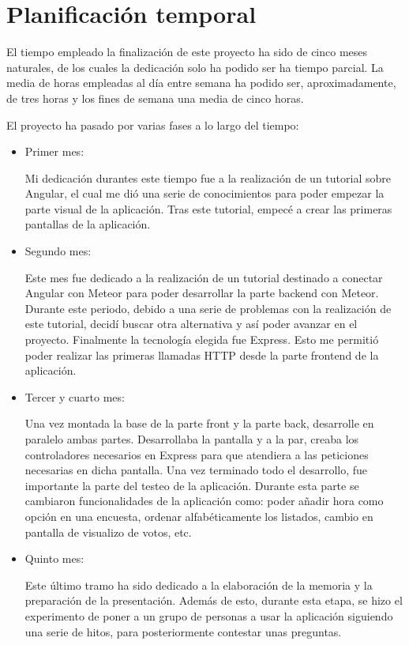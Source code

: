 \documentclass[a4paper, 12pt]{book}
\begin{document}
\section{Planificaci\'on temporal}
\label{sec:planificacion-temporal}

El tiempo empleado la finalizaci\'on de este proyecto ha sido de cinco meses naturales, de los cuales la dedicaci\'on solo ha podido ser ha tiempo parcial. La media de horas empleadas al d\'ia entre semana ha podido ser, aproximadamente, de tres horas y los fines de semana una media de cinco horas. 

El proyecto ha pasado por varias fases a lo largo del tiempo:

\begin{itemize}
\item Primer mes:

 Mi dedicaci\'on durantes este tiempo fue a la realizaci\'on de un tutorial sobre Angular, el cual me di\'o una serie de conocimientos para poder empezar la parte visual de la aplicaci\'on. Tras este tutorial, empec\'e a crear las primeras pantallas de la aplicaci\'on.

 \item Segundo mes: 

Este mes fue dedicado a la realizaci\'on de un tutorial destinado a conectar Angular con Meteor para poder desarrollar la parte backend con Meteor. Durante este periodo, debido a una serie de problemas con la realizaci\'on de este tutorial, decid\'i buscar otra alternativa y as\'i poder avanzar en el proyecto. Finalmente la tecnolog\'ia elegida fue Express. Esto me permiti\'o poder realizar las primeras llamadas HTTP desde la parte frontend de la aplicaci\'on.

\item Tercer y cuarto mes: 

Una vez montada la base de la parte front y la parte back, desarrolle en paralelo ambas partes. Desarrollaba la pantalla y a la par,  creaba los controladores necesarios en Express para que atendiera a las peticiones necesarias en dicha pantalla. Una vez terminado todo el desarrollo, fue importante la parte del testeo de la aplicaci\'on. Durante esta parte se cambiaron funcionalidades de la aplicaci\'on como: poder a\~nadir hora como opci\'on en una encuesta, ordenar alfab\'eticamente los listados, cambio en pantalla de visualizo de votos, etc.

\item Quinto mes: 

Este \'ultimo tramo ha sido dedicado a la elaboraci\'on de la memoria y la preparaci\'on de la presentaci\'on. Adem\'as de esto, durante esta etapa, se hizo el experimento de poner a un grupo de personas a usar la aplicaci\'on siguiendo una serie de hitos, para posteriormente contestar unas preguntas.

\end{itemize}
\end{document}
